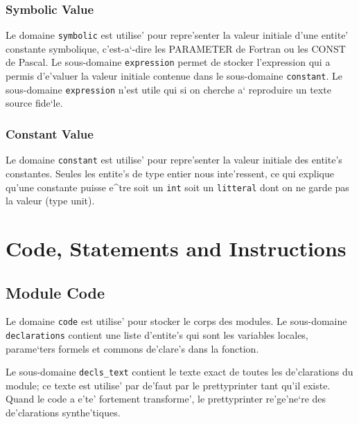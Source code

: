 \subsubsection{Symbolic Value}
\label{subsubsection-symbolic}

{
Le domaine \verb/symbolic/ est utilise' pour repre'senter la valeur
initiale d'une entite' constante symbolique, c'est-a`-dire les PARAMETER
de Fortran ou les CONST de Pascal. Le sous-domaine \verb/expression/
permet de stocker l'expression qui a permis d'e'valuer la valeur
initiale contenue dans le sous-domaine \verb/constant/. Le sous-domaine
\verb/expression/ n'est utile qui si on cherche a` reproduire un texte
source fide`le.
}

\subsubsection{Constant Value}
\label{subsubsection-constant}

{
Le domaine \verb/constant/ est utilise' pour repre'senter la valeur
initiale des entite's constantes. Seules les entite's de type entier
nous inte'ressent, ce qui explique qu'une constante puisse e^tre soit un
\verb/int/ soit un \verb/litteral/ dont on ne garde pas la valeur (type unit).
}

\section{Code, Statements and Instructions}
\label{code}

\subsection{Module Code}
\label{subsection-code}

{ 
Le domaine \verb/code/ est utilise'
pour stocker le corps des modules. Le sous-domaine \verb/declarations/
contient une liste d'entite's qui sont les variables locales,
parame`ters formels et commons de'clare's dans la fonction.

Le sous-domaine {\tt decls\_text} contient le texte exact de toutes les
de'clarations du module; ce texte est utilise' par de'faut par le
prettyprinter tant qu'il existe. Quand le code a e'te' fortement
transforme', le prettyprinter re'ge'ne`re des de'clarations
synthe'tiques.
}

